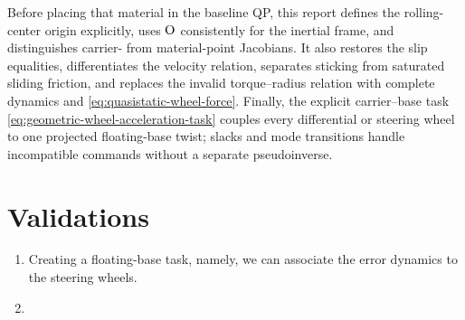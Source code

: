 \documentclass[10pt]{article}
\begin{document}
Before placing that material in the baseline QP, this report defines the
rolling-center origin explicitly, uses $\text{O}$ consistently for the
inertial frame, and distinguishes carrier- from material-point Jacobians. It
also restores the slip equalities, differentiates the velocity relation,
separates sticking from saturated sliding friction, and replaces the invalid
torque--radius relation with complete dynamics and
\eqref{eq:quasistatic-wheel-force}. Finally, the explicit carrier--base task
\eqref{eq:geometric-wheel-acceleration-task} couples every differential or
steering wheel to one projected floating-base twist; slacks and mode
transitions handle incompatible commands without a separate pseudoinverse.


\section{Validations}
\label{sec:validation}

\begin{enumerate}
  
\item Creating a floating-base task, namely, we can associate the error dynamics to the steering wheels.  

  
\item 

  
\end{enumerate}
\end{document}
